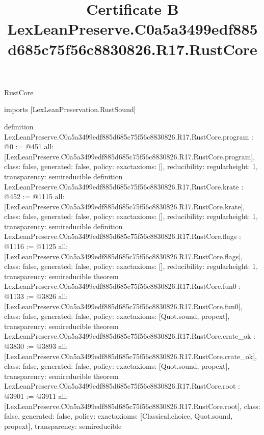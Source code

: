 \begin{lexlean}{RustCore}
\title{Certificate B LexLeanPreserve.C0a5a3499edf885d685c75f56c8830826.R17.RustCore}
\begin{coremodule}
imports [LexLeanPreservation.RustSound]

definition LexLeanPreserve.C0a5a3499edf885d685c75f56c8830826.R17.RustCore.program : @0 := @451 {
  all: [LexLeanPreserve.C0a5a3499edf885d685c75f56c8830826.R17.RustCore.program],
  class: false,
  generated: false,
  policy: exact{axioms: []},
  reducibility: regular{height: 1},
  transparency: semireducible
}
definition LexLeanPreserve.C0a5a3499edf885d685c75f56c8830826.R17.RustCore.krate : @452 := @1115 {
  all: [LexLeanPreserve.C0a5a3499edf885d685c75f56c8830826.R17.RustCore.krate],
  class: false,
  generated: false,
  policy: exact{axioms: []},
  reducibility: regular{height: 1},
  transparency: semireducible
}
definition LexLeanPreserve.C0a5a3499edf885d685c75f56c8830826.R17.RustCore.flags : @1116 := @1125 {
  all: [LexLeanPreserve.C0a5a3499edf885d685c75f56c8830826.R17.RustCore.flags],
  class: false,
  generated: false,
  policy: exact{axioms: []},
  reducibility: regular{height: 1},
  transparency: semireducible
}
theorem LexLeanPreserve.C0a5a3499edf885d685c75f56c8830826.R17.RustCore.fun0 : @1133 := @3826 {
  all: [LexLeanPreserve.C0a5a3499edf885d685c75f56c8830826.R17.RustCore.fun0],
  class: false,
  generated: false,
  policy: exact{axioms: [Quot.sound, propext]},
  transparency: semireducible
}
theorem LexLeanPreserve.C0a5a3499edf885d685c75f56c8830826.R17.RustCore.crate_ok : @3830 := @3893 {
  all: [LexLeanPreserve.C0a5a3499edf885d685c75f56c8830826.R17.RustCore.crate_ok],
  class: false,
  generated: false,
  policy: exact{axioms: [Quot.sound, propext]},
  transparency: semireducible
}
theorem LexLeanPreserve.C0a5a3499edf885d685c75f56c8830826.R17.RustCore.root : @3901 := @3911 {
  all: [LexLeanPreserve.C0a5a3499edf885d685c75f56c8830826.R17.RustCore.root],
  class: false,
  generated: false,
  policy: exact{axioms: [Classical.choice, Quot.sound, propext]},
  transparency: semireducible
}


\end{coremodule}
\end{lexlean}
